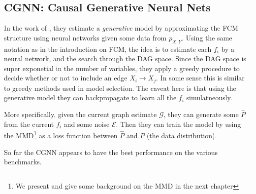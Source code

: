 \subsection{CGNN: Causal Generative Neural Nets}

In the work of \cite{goudet2017causal}, they estimate a \textit{generative} model by approximating
the FCM structure using neural networks given some data from $p_{X, Y}$. Using the same notation
as in the introduction on FCM, the idea is to estimate each $f_i$ by a neural network, and the 
search through the DAG space. Since the DAG space is super exponetial in the number of variables,
they apply a greedy procedure to decide whether or not to include an edge $X_i \rightarrow X_j$.
In some sense this is similar to greedy methods used in model selection. The caveat here is that
using the generative model they can backpropagate to learn all the $f_i$ simulatneously. 

More specifically, given the current graph estimate $\mathcal{G}$, they can generate some $\hat{P}$
from the current $f_i$ and some noise $\mathcal{E}$. Then they can train the model by using 
the MMD\footnote{We present and give some background on the MMD in the next chapter} 
as a loss function between $\hat{P}$ and $P$ (the data distribution).

So far the CGNN appears to have the best performance on the various benchmarks. 







